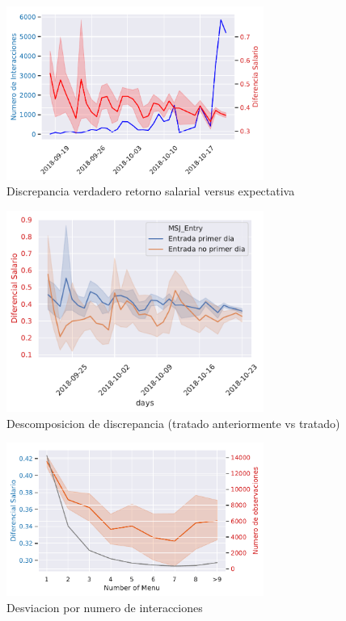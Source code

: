 \documentclass[12pt]{article}
\begin{document}
\begin{figure}[h]
\caption{Discrepancia verdadero retorno salarial versus expectativa}
\centering
\includegraphics[width=0.75\textwidth]{Wage_deviation_byday.pdf}
\end{figure}


\begin{figure}[h]
\caption{Descomposicion de discrepancia (tratado anteriormente vs tratado)}
\centering
\includegraphics[width=0.75\textwidth]{Wage_deviation_by_entry.pdf}
\end{figure}



\begin{figure}[h]
\caption{Desviacion por numero de interacciones}
\centering
\includegraphics[width=0.75\textwidth]{Wage_deviation_by_nint.pdf}
\end{figure}
\end{document}
